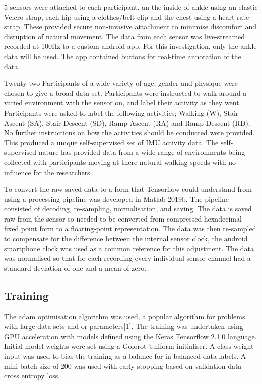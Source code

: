 \documentclass[sensors,article,submit,moreauthors,pdftex]{Definitions/mdpi}
\begin{document}
5 sensors were attached to each participant, an the inside of ankle using an elastic Velcro strap, each hip using a clothes/belt clip and the chest using a heart rate strap. These provided secure non-invasive attachment to minimise discomfort and disruption of natural movement. The data from each sensor was live-streamed recorded at 100Hz to a custom android app. For this investigation, only the ankle data will be used. The app contained buttons for real-time annotation of the data. 

Twenty-two Participants of a wide variety of age, gender and physique were chosen to give a broad data set. Participants were instructed to walk around a varied environment with the sensor on, and label their activity as they went. Participants were asked to label the following activities; Walking (W), Stair Ascent (SA), Stair Descent (SD), Ramp Ascent (RA) and Ramp Descent (RD). No further instructions on how the activities should be conducted were provided. This produced a unique self-supervised set of IMU activity data. The self-supervised nature has provided data from a wide range of environments being collected with participants moving at there natural walking speeds with no influence for the researchers.

To convert the raw saved data to a form that Tensorflow could understand from using a processing pipeline was developed in Matlab 2019b. The pipeline consisted of decoding, re-sampling, normalisation, and saving. The data is saved raw from the sensor so needed to be converted from compressed hexadecimal fixed point form to a floating-point representation. The data was then re-sampled to compensate for the difference between the internal sensor clock, the android smartphone clock was used as a common reference for this adjustment. The data was normalised so that for each recording every individual sensor channel had a standard deviation of one and a mean of zero.

\subsection{Training}
The adam optimisation algorithm was used, a popular algorithm for problems with large data-sets and or parameters[1]. The training was undertaken using GPU acceleration with models defined using the Keras Tensorflow 2.1.0 language. Initial model weights were set using a Golorot Uniform initialiser. A class weight input was used to bias the training as a balance for in-balanced data labels. A mini batch size of 200 was used with early stopping based on validation data cross entropy loss.
\end{document}
